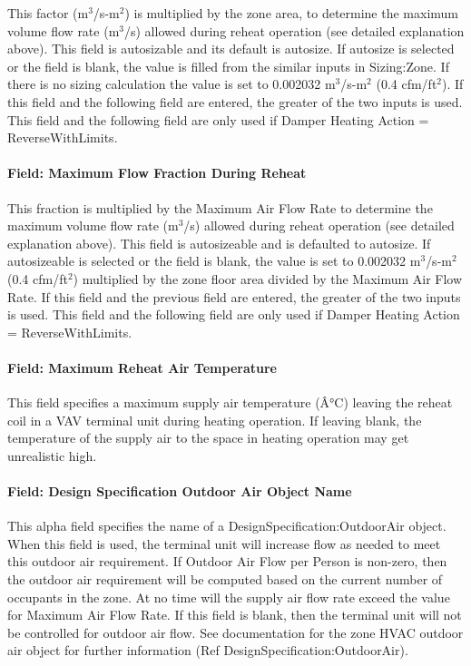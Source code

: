 This factor (m\(^{3}\)/s-m\(^{2}\)) is multiplied by the zone area, to determine the maximum volume flow rate (m\(^{3}\)/s) allowed during reheat operation (see detailed explanation above). This field is autosizable and its default is autosize. If autosize is selected or the field is blank, the value is filled from the similar inputs in Sizing:Zone. If there is no sizing calculation the value is set to 0.002032 m\(^{3}\)/s-m\(^{2}\) (0.4 cfm/ft\(^{2}\)). If this field and the following field are entered, the greater of the two inputs is used. This field and the following field are only used if Damper Heating Action = ReverseWithLimits.

\paragraph{Field: Maximum Flow Fraction During Reheat}\label{field-maximum-flow-fraction-during-reheat}

This fraction is multiplied by the Maximum Air Flow Rate to determine the maximum volume flow rate (m\(^{3}\)/s) allowed during reheat operation (see detailed explanation above). This field is autosizeable and is defaulted to autosize. If autosizeable is selected or the field is blank, the value is set to 0.002032 m\(^{3}\)/s-m\(^{2}\) (0.4 cfm/ft\(^{2}\)) multiplied by the zone floor area divided by the Maximum Air Flow Rate. If this field and the previous field are entered, the greater of the two inputs is used. This field and the following field are only used if Damper Heating Action = ReverseWithLimits.

\paragraph{Field: Maximum Reheat Air Temperature}\label{field-maximum-reheat-air-temperature-1}

This field specifies a maximum supply air temperature (Â°C) leaving the reheat coil in a VAV terminal unit during heating operation. If leaving blank, the temperature of the supply air to the space in heating operation may get unrealistic high.

\paragraph{Field: Design Specification Outdoor Air Object Name}\label{field-design-specification-outdoor-air-object-name}

This alpha field specifies the name of a DesignSpecification:OutdoorAir object. When this field is used, the terminal unit will increase flow as needed to meet this outdoor air requirement. If Outdoor Air Flow per Person is non-zero, then the outdoor air requirement will be computed based on the current number of occupants in the zone. At no time will the supply air flow rate exceed the value for Maximum Air Flow Rate. If this field is blank, then the terminal unit will not be controlled for outdoor air flow. See documentation for the zone HVAC outdoor air object for further information (Ref DesignSpecification:OutdoorAir).


